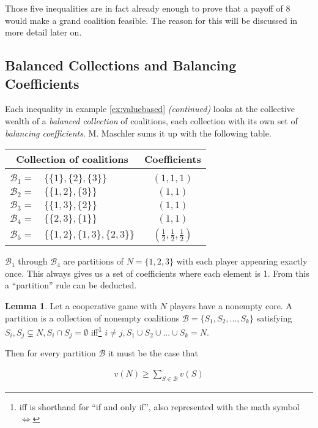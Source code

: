 \documentclass[10pt,a4paper,titlepage]{article}
\theoremstyle{plain}
\theoremstyle{definition}
\newtheorem{lemma}[thm]{Lemma}
\begin{document}
Those five inequalities are in fact already enough to prove that a payoff of 8 would make a grand coalition feasible. The reason for this will be discussed in more detail later on.




\subsection{Balanced Collections and Balancing Coefficients}
Each inequality in example \ref{ex:valuebased} \textit{(continued)} looks at the collective wealth of a \textit{balanced collection} of coalitions, each collection with its own set of \textit{balancing coefficients}. M. Maschler\cite{maschler} sums it up with the following table.\vspace{8pt}

\begin{tabular}{ | r l | c | }
    \multicolumn{2}{c}{Collection of coalitions} & \multicolumn{1}{c}{Coefficients}\\[2pt]
    \hline & & \\[-8pt]
    $\mathcal{B}_1 =$ & $\{\{1\}, \{2\}, \{3\}\}$ & $(1, 1, 1)$\\[2pt]
    $\mathcal{B}_2 =$ & $\{\{1, 2\}, \{3\}\}$ & $(1, 1)$\\[2pt]
    $\mathcal{B}_3 =$ & $\{\{1, 3\}, \{2\}\}$ & $(1, 1)$\\[2pt]
    $\mathcal{B}_4 =$ & $\{\{2, 3\}, \{1\}\}$ & $(1, 1)$\\[2pt]
    $\mathcal{B}_5 =$ & $\{\{1, 2\}, \{1, 3\}, \{2, 3\}\}$ & $(\frac{1}{2}, \frac{1}{2}, \frac{1}{2})$\\[2pt]
    \hline
\end{tabular}\vspace{8pt}

$\mathcal{B}_1$ through $\mathcal{B}_4$ are partitions of $N = \{1, 2, 3\}$ with each player appearing exactly once. This always gives us a set of coefficients where each element is 1. From this a \enquote{partition} rule can be deducted.

\begin{lemma}
    Let a cooperative game with $N$ players have a nonempty core. A partition is a collection of nonempty coalitions $\mathcal{B} = \{S_1, S_2, ..., S_k\}$ satisfying $S_i, S_j \subsetneq N, S_i \cap S_j = \emptyset$ iff\footnote{iff is shorthand for \enquote{if and only if}, also represented with the math symbol $\Leftrightarrow$} $i \neq j, S_1 \cup S_2 \cup ... \cup S_k = N$.

    Then for every partition $\mathcal{B}$ it must be the case that

    \begin{align}
        v(N) \geq \sum_{S \in \mathcal{B}} v(S)
    \end{align}
\end{lemma}
\end{document}
